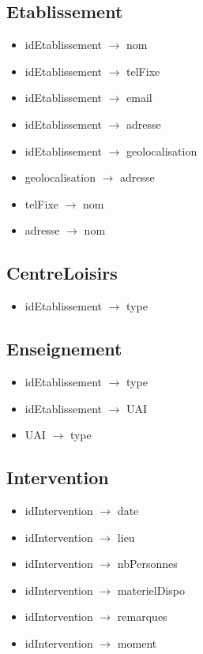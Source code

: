 \documentclass[asi, sansVersion]{picInsa}
\begin{document}
\subsection*{Etablissement}
\begin{itemize}
\item[] idEtablissement $\rightarrow$ nom 
\item[] idEtablissement $\rightarrow$ telFixe
\item[] idEtablissement $\rightarrow$ email
\item[] idEtablissement $\rightarrow$ adresse
\item[] idEtablissement $\rightarrow$ geolocalisation
\item[] geolocalisation $\rightarrow$ adresse
\item[] telFixe $\rightarrow$ nom
\item[] adresse $\rightarrow$ nom
\end{itemize}

\subsection*{CentreLoisirs}
\begin{itemize}
\item[]	idEtablissement $\rightarrow$ type
\end{itemize}

\subsection*{Enseignement}
\begin{itemize}
\item[]	idEtablissement $\rightarrow$ type
\item[] idEtablissement $\rightarrow$ UAI
\item[] UAI $\rightarrow$ type
\end{itemize}

\subsection*{Intervention}
\begin{itemize}
\item[]	idIntervention $\rightarrow$ date
\item[]	idIntervention $\rightarrow$ lieu
\item[]	idIntervention $\rightarrow$ nbPersonnes
\item[]	idIntervention $\rightarrow$ materielDispo
\item[]	idIntervention $\rightarrow$ remarques
\item[]	idIntervention $\rightarrow$ moment
\end{itemize}
\end{document}
